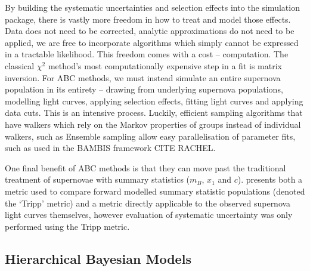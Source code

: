 \documentclass[a4paper,fleqn,usenatbib]{mnras}
\newcommand{\red}{\color{red}}
\begin{document}
By building the systematic uncertainties and selection effects into the simulation package, there is vastly more freedom in how to treat and model those effects. Data does not need to be corrected, analytic approximations do not need to be applied, we are free to incorporate algorithms which simply cannot be expressed in a tractable likelihood. This freedom comes with a cost -- computation. The classical $\chi^2$ method's most computationally expensive step in a fit is matrix inversion. For ABC methods, we must instead simulate an entire supernova population in its entirety -- drawing from underlying supernova populations, modelling light curves, applying selection effects, fitting light curves and applying data cuts. This is an intensive process. Luckily, efficient sampling algorithms that have walkers which rely on the Markov properties of groups instead of individual walkers, such as Ensemble sampling \citep{Foreman-Mackey2013} allow easy parallelisation of parameter fits, such as used in the BAMBIS framework {\red CITE RACHEL}.

One final benefit of ABC methods is that they can move past the traditional treatment of supernovae with summary statistics ($m_B$, $x_1$ and $c$). \citet{Jennings2016} presents both a metric used to compare forward modelled summary statistic populations (denoted the `Tripp' metric) and a metric directly applicable to the observed supernova light curves themselves, however evaluation of systematic uncertainty was only performed using the Tripp metric.

\subsection{Hierarchical Bayesian Models}
\end{document}
